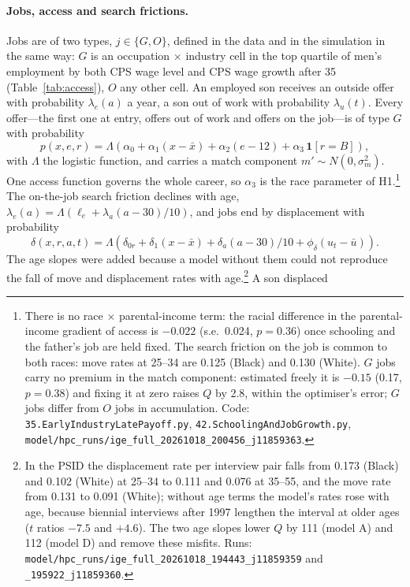 \paragraph{Jobs, access and search frictions.} Jobs are of two types, $j \in \{G, O\}$, defined in the data and in the
simulation in the same way: $G$ is an occupation $\times$ industry cell in the top quartile of men's employment by both
CPS wage level and CPS wage growth after 35 (Table~\ref{tab:access}), $O$ any other cell. An employed son receives an
outside offer with probability $\lambda_e(a)$ a year, a son out of work with probability $\lambda_u(t)$. Every
offer---the first one at entry, offers out of work and offers on the job---is of type $G$ with probability
\begin{equation}\label{eq:modelaccess}
p(x, e, r) = \Lambda\left(\alpha_0 + \alpha_1 (x - \bar x) + \alpha_2 (e - 12) + \alpha_3\, \mathbf 1[r = B]\right),
\end{equation}
with $\Lambda$ the logistic function, and carries a match component $m' \sim N(0, \sigma_m^2)$. One access function
governs the whole career, so $\alpha_3$ is the race parameter of H1.\footnote{There is no race $\times$ parental-income
term: the racial difference in the parental-income gradient of access is $-0.022$ (s.e.\ 0.024, $p = 0.36$) once
schooling and the father's job are held fixed. The search friction on the job is common to both races: move rates at
25--34 are 0.125 (Black) and 0.130 (White). $G$ jobs carry no premium in the match component: estimated freely it is
$-0.15$ (0.17, $p = 0.38$) and fixing it at zero raises $Q$ by 2.8, within the optimiser's error; $G$ jobs differ from
$O$ jobs in accumulation. Code: \texttt{35.EarlyIndustryLatePayoff.py}, \texttt{42.SchoolingAndJobGrowth.py},
\texttt{model/hpc\_runs/ige\_full\_20261018\_200456\_j11859363}.} The on-the-job search friction declines with age,
$\lambda_e(a) = \Lambda(\ell_e + \lambda_a (a - 30)/10)$, and jobs end by displacement with probability
\begin{equation}\label{eq:modeldelta}
\delta(x, r, a, t) = \Lambda\left(\delta_{0r} + \delta_1 (x - \bar x) + \delta_a (a - 30)/10 + \phi_\delta (u_t -
\bar u)\right).
\end{equation}
The age slopes were added because a model without them could not reproduce the fall of move and displacement rates with
age.\footnote{In the PSID the displacement rate per interview pair falls from 0.173 (Black) and 0.102 (White) at 25--34
to 0.111 and 0.076 at 35--55, and the move rate from 0.131 to 0.091 (White); without age terms the model's rates rose
with age, because biennial interviews after 1997 lengthen the interval at older ages ($t$ ratios $-7.5$ and $+4.6$). The
two age slopes lower $Q$ by 111 (model A) and 112 (model D) and remove these misfits. Runs:
\texttt{model/hpc\_runs/ige\_full\_20261018\_194443\_j11859359} and \texttt{\_195922\_j11859360}.} A son displaced
